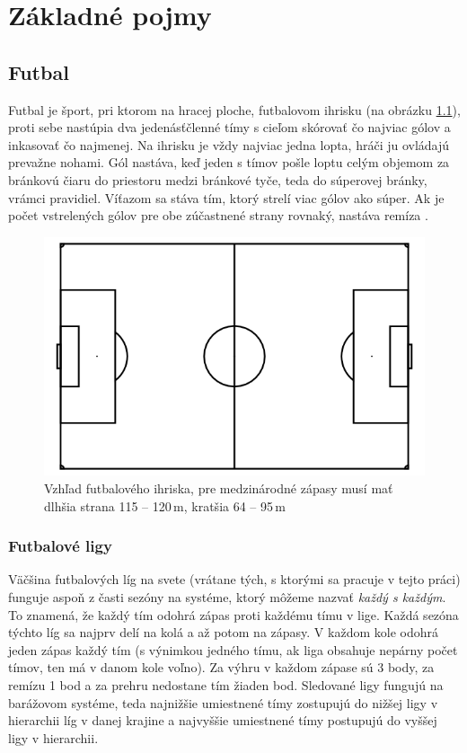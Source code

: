\chapter{Základné pojmy}

\section{Futbal}
Futbal je šport, pri ktorom na hracej ploche, futbalovom ihrisku (na obrázku \ref{pitch}), proti sebe nastúpia dva jedenásťčlenné tímy s cieľom skórovať čo najviac gólov a inkasovať čo najmenej.
Na ihrisku je vždy najviac jedna lopta, hráči ju ovládajú prevažne nohami. 
Gól nastáva, keď jeden s tímov pošle loptu celým objemom za bránkovú čiaru do priestoru medzi bránkové tyče, teda do súperovej bránky, vrámci pravidiel. 
Víťazom sa stáva tím, ktorý strelí viac gólov ako súper. 
Ak je počet vstrelených gólov pre obe zúčastnené strany rovnaký, nastáva remíza 
\citep{hry1}.
\noindent
\begin{figure}
\centering
\includegraphics[scale=0.3]{../img/pitch.png}
\caption{Vzhľad futbalového ihriska, pre medzinárodné zápasy musí mať dlhšia strana 115 -- 120\,m, kratšia 64 -- 95\,m} 
\label{pitch}
\end{figure}

\subsection{Futbalové ligy}
Väčšina futbalových líg na svete (vrátane tých, s ktorými sa pracuje v tejto práci) funguje aspoň z časti sezóny na systéme, ktorý môžeme nazvať \textit{každý s každým}.
To znamená, že každý tím odohrá zápas proti každému tímu v lige.
Každá sezóna týchto líg sa najprv delí na kolá a až potom na zápasy.
V každom kole odohrá jeden zápas každý tím (s výnimkou jedného tímu, ak liga obsahuje nepárny počet tímov, ten má v danom kole voľno).
Za výhru v každom zápase sú 3 body, za remízu 1 bod a za prehru nedostane tím žiaden bod.
Sledované ligy fungujú na barážovom systéme, teda najnižšie umiestnené tímy zostupujú do nižšej ligy v hierarchii líg v danej krajine a najvyššie umiestnené tímy postupujú do vyššej ligy v hierarchii.

